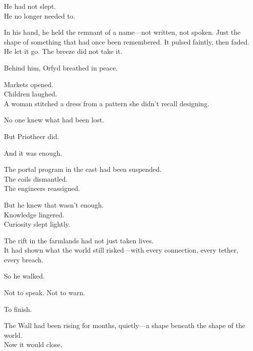 \documentclass[12pt]{article}
\begin{document}
\vspace{0.5em}
He had not slept.\\
He no longer needed to.

\vspace{0.5em}
In his hand, he held the remnant of a name---not written, not spoken. Just the shape of something that had once been remembered. It pulsed faintly, then faded. He let it go. The breeze did not take it.

\vspace{0.5em}
Behind him, Orfyd breathed in peace.

\vspace{0.5em}
Markets opened.\\
Children laughed.\\
A woman stitched a dress from a pattern she didn’t recall designing.

\vspace{0.5em}
No one knew what had been lost.

\vspace{0.5em}
But Priotheer did.

\vspace{0.5em}
And it was enough.

\vspace{0.5em}
The portal program in the east had been suspended.\\
The coils dismantled.\\
The engineers reassigned.

\vspace{0.5em}
But he knew that wasn’t enough.\\
Knowledge lingered.\\
Curiosity slept lightly.

\vspace{0.5em}
The rift in the farmlands had not just taken lives.\\
It had shown what the world still risked---with every connection, every tether, every breach.

\vspace{0.5em}
So he walked.

\vspace{0.5em}
Not to speak. Not to warn.

\vspace{0.5em}
To finish.

\vspace{0.5em}
The Wall had been rising for months, quietly---a shape beneath the shape of the world.\\
Now it would close.
\end{document}
